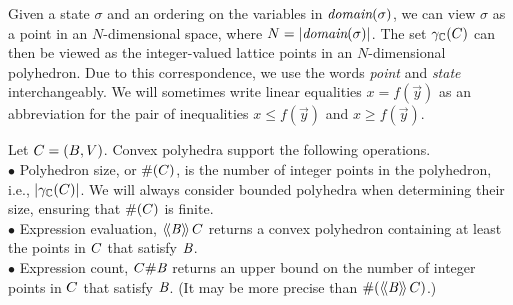 Given a state $\sigma$ and an ordering on the variables in $\textit{domain}(\sigma)$, we can view $\sigma$ as a point in
an $N$-dimensional space, where $N = \left| \textit{domain}(\sigma) \right|$.  The set $\gamma_{\mathbb{C}}(C)$ can then be viewed as the integer-valued lattice points in an $N$-dimensional polyhedron.
Due to this correspondence, we use the words \textit{point} and
\textit{state} interchangeably.  We will sometimes write linear equalities $x = f(\vec{y})$ as an abbreviation for the pair of inequalities $x \leq f(\vec{y})$ and $x \geq f(\vec{y})$.

\newcommand{\myitem}{~\\ \noindent $\bullet$ }
Let $ C = (B, V) $. Convex polyhedra support the following
operations.
\myitem{} Polyhedron size, or $ \#(C) $, is the number of
   integer points in the polyhedron, i.e., $\left| \gamma_{\mathbb{C}}(C) \right|$.
   We will always consider bounded polyhedra when determining their
   size, ensuring that $\#(C)$ is finite.
\myitem{} Expression evaluation, $\langle\!\langle{\mathit{B}}\rangle\!\rangle\,{C}$ returns a
   convex polyhedron containing at least the points in $C$ that satisfy
$\mathit{B}$.
\myitem{} Expression count, $C \# \mathit{B}$ returns an upper bound
 on the number of integer points in $C$ that satisfy $\mathit{B}$.  (It
 may be more precise than $\#(\langle\!\langle{\mathit{B}}\rangle\!\rangle\,{C})$.)
